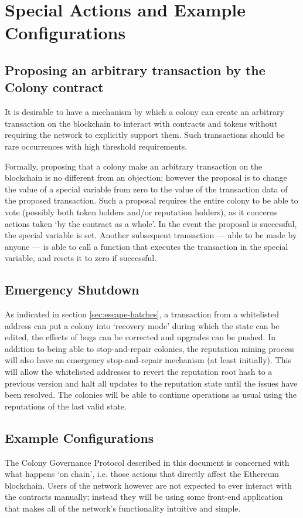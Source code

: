 

\section{Special Actions and Example Configurations}\label{sec:special-cases}

\subsection{Proposing an arbitrary transaction by the Colony contract}\label{sec:arbitrary-transaction}
It is desirable to have a mechanism by which a colony can create an arbitrary transaction on the blockchain to interact with contracts and tokens without requiring the network to explicitly support them. Such transactions should be rare occurrences with high threshold requirements.

Formally, proposing that a colony make an arbitrary transaction on the blockchain is no different from an objection; however the proposal is to change the value of a special variable from zero to the value of the transaction data of the proposed transaction. Such a proposal requires the entire colony to be able to vote (possibly both token holders and/or reputation holders), as it concerns actions taken `by the contract as a whole'. In the event the proposal is successful, the special variable is set. Another subsequent transaction --- able to be made by anyone --- is able to call a function that executes the transaction in the special variable, and resets it to zero if successful.


\subsection{Emergency Shutdown}\label{sec:big-red-button}
As indicated in section \ref{sec:escape-hatches}, a transaction from a whitelisted address can put a colony into `recovery mode' during which the state can be edited, the effects of bugs can be corrected and upgrades can be pushed. In addition to being able to stop-and-repair colonies, the reputation mining process will also have an emergency stop-and-repair mechanism (at least initially). This will allow the whitelisted addresses to revert the reputation root hash to a previous version and halt all updates to the reputation state until the issues have been resolved. The colonies will be able to continue operations as usual using the reputations of the last valid state.

\subsection{Example Configurations}\label{sec:example-configs}
The Colony Governance Protocol described in this document is concerned with what happens `on chain', i.e. those actions that directly affect the Ethereum blockchain. Users of the network however are not expected to ever interact with the contracts manually; instead they will be using some front-end application that makes all of the network's functionality intuitive and simple.

